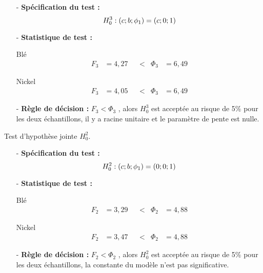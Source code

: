     \begin{itemize}
    \item[-]\textbf{Spécification du test :} 
    \begin{equation*}
        H_{0}^{3} : (c; b; \phi_{1}) = (c;0;1)\\
    \end{equation*}
    \item[-]\textbf{Statistique de test :} 
    \begin{multicols}{2}
        \centering Blé
        \begin{align*}
            F_{3} &= 4,27  & &< & \Phi_{3} &= 6,49
        \end{align*}
    
        \columnbreak
    
        \centering Nickel
        \begin{align*}
            F_{3} &= 4,05  & &< & \Phi_{3} &= 6,49
        \end{align*}
    \end{multicols}
    \item[-]\textbf{Règle de décision :} $F_{3} < \Phi_{3}$ , alors $H_{0}^{3}$ est acceptée au risque de 5\% pour les deux échantillons, il y a racine unitaire et le 
    paramètre de pente est nulle.
    \end{itemize}
    Test d'hypothèse jointe $H_{0}^{2}$.
    \begin{itemize}
    \item[-]\textbf{Spécification du test :} 
    \begin{equation*}
        H_{0}^{2} : (c; b; \phi_{1}) = (0;0;1)\\
    \end{equation*}
    \item[-]\textbf{Statistique de test :}
    \begin{multicols}{2}
        \centering Blé
        \begin{align*}
            F_{2} &= 3,29  & &< & \Phi_{2} &= 4,88
        \end{align*}
    
        \columnbreak
    
        \centering Nickel
        \begin{align*}
            F_{2} &= 3,47  & &< & \Phi_{2} &= 4,88
        \end{align*}
    \end{multicols}  
    \item[-]\textbf{Règle de décision :} $F_{2} < \Phi_{2}$ , alors $H_{0}^{2}$ est acceptée au risque de 5\% pour les deux échantillons, la constante du modèle n'est pas
    significative.
    \end{itemize}
